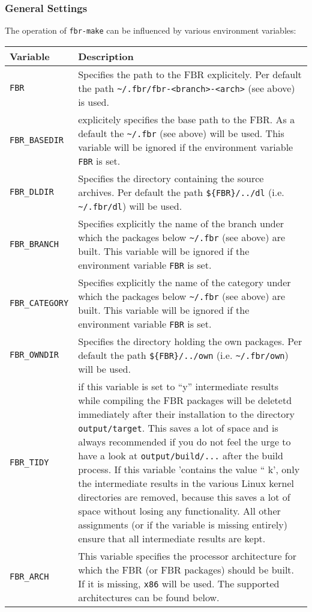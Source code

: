 \subsubsection{General Settings}

The operation of \texttt{fbr-make} can be influenced by various
environment variables:

\begin{longtable}{|l|p{10cm}|}
    \hline
    \multicolumn{1}{|l}{\textbf{Variable}} &
    \multicolumn{1}{|l|}{\textbf{Description}} \\
    \hline
    \endhead
    \hline
    \endfoot
    \endlastfoot
\texttt{FBR} &
    Specifies the path to the FBR explicitely. Per default the path
    \texttt{\~{}/.fbr/fbr-<branch>-<arch>} (see above) is used.\\
\hline
\texttt{FBR\_BASEDIR} &
    explicitely specifies the base path to the FBR. As a default the \texttt{\~{}/.fbr}
    (see above) will be used. This variable will be ignored if
    the environment variable \texttt{FBR} is set. \\
\hline
\texttt{FBR\_DLDIR} &
    Specifies the directory containing the source archives. Per default
    the path \texttt{\$\{FBR\}/../dl} (i.e. \texttt{\~{}/.fbr/dl})
    will be used. \\
\hline
\texttt{FBR\_BRANCH} &
    Specifies explicitly the name of the branch under which the packages below
    \texttt{\~{}/.fbr} (see above) are built. This variable will be ignored if
    the environment variable \texttt{FBR} is set. \\
\hline
\texttt{FBR\_CATEGORY} &
    Specifies explicitly the name of the category under which the packages below
    \texttt{\~{}/.fbr} (see above) are built. This variable will be ignored if
    the environment variable \texttt{FBR} is set. \\
\hline
\texttt{FBR\_OWNDIR} &
    Specifies the directory holding the own packages. Per default
    the path \texttt{\$\{FBR\}/../own} (i.e. \texttt{\~{}/.fbr/own})
    will be used. \\
\hline
\texttt{FBR\_TIDY} &
    if this variable is set to ``y'' intermediate results while compiling the
    FBR packages will be deletetd immediately after their installation to the directory
    \texttt{output/target}. This saves a lot of space and is always recommended if
    you do not feel the urge to have a look at \texttt{output/build/...}
    after the build process.
    If this variable 'contains the value `` k', only
    the intermediate results in the various Linux kernel directories are removed,
    because this saves a lot of space without losing any functionality. All other
    assignments (or if the variable is missing entirely) ensure that all intermediate
    results are kept.
    \\
\hline
\texttt{FBR\_ARCH} &
    This variable specifies the processor architecture for which the FBR (or
    FBR packages) should be built. If it is missing, \texttt{x86} will be
    used. The supported architectures can be found below. \\
\hline
\end{longtable}

